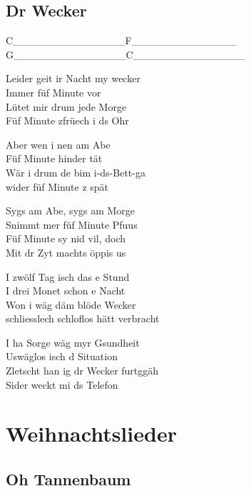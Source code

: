 \documentclass[
  letterpaper,
]{scrbook}
\begin{document}
\hypertarget{dr-wecker}{%
\chapter{Dr Wecker}\label{dr-wecker}}

\textbar C\_\_\_\_\_\_\_\textbar\_\_\_\_\_\_\_\_\textbar F\_\_\_\_\_\_\textbar\_\_\_\_\_\_\_\_\textbar{}\\
\textbar G\_\_\_\_\_\_\_\textbar\_\_\_\_\_\_\_\_\textbar C\_\_\_\_\_\_\_\textbar\_\_\_\_\_\_\_\_\textbar{}

Leider geit ir Nacht my wecker\\
Immer füf Minute vor\\
Lütet mir drum jede Morge\\
Füf Minute z\textquotesingle früech i ds Ohr

Aber wen i nen am Abe\\
Füf Minute hinder tät\\
Wär i drum de bim i-ds-Bett-ga\\
wider füf Minute z spät

Syg\textquotesingle s am Abe, syg\textquotesingle s am Morge\\
S\textquotesingle nimmt mer füf Minute Pfuus\\
Füf Minute sy nid vil, doch\\
Mit dr Zyt macht\textquotesingle s öppis us

I zwölf Tag isch das e Stund\\
I drei Monet schon e Nacht\\
Won i wäg däm blöde Wecker\\
schliesslech schloflos hätt verbracht

I ha Sorge wäg myr Gsundheit\\
Uswäglos isch d Situation\\
Zletscht han ig dr Wecker furtggäh\\
Sider weckt mi ds Telefon

\part{Weihnachtslieder}

\hypertarget{oh-tannenbaum}{%
\chapter{Oh Tannenbaum}\label{oh-tannenbaum}}
\end{document}
